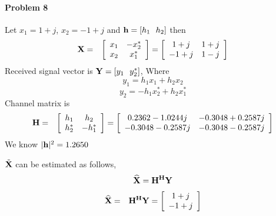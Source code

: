 \documentclass[12pt]{article}
\renewcommand{\hat}{\widehat}
\begin{document}
\paragraph{Problem 8}
Let $x_1=1 + j$, $x_2=-1 + j$ and ${\bf h}=[h_1~~h_2]$ then
\begin{eqnarray*}
{\bf X} &=& \left[
\begin{array}{cccc}
x_1 & -x_2^* \\
x_2 & x_1^*
\end{array}
\right]=\left[
\begin{array}{cccc}
1+j & 1+j \\
-1+j & 1-j
\end{array}
\right]
\end{eqnarray*}
Received signal vector is ${\bf Y}=[y_1~~y_2^*]$, Where $$y_1=h_1x_1+h_2x_2$$ $$y_2=-h_1x_2^*+h_2x_1^*$$
Channel matrix is
\begin{eqnarray*}
{\bf H} &=& \left[
\begin{array}{cccc}
h_1 & h_2 \\
h_2^* & -h_1^*
\end{array}
\right]=\left[
\begin{array}{cccc}
0.2362 - 1.0244j & -0.3048 + 0.2587j \\
-0.3048 - 0.2587j & -0.3048 - 0.2587j
\end{array}
\right]
\end{eqnarray*}
We know $|{\bf h}|^2=1.2650$

$\tilde{{\bf X}}$ can be estimated as follows, $$\hat{{\bf X}}={\bf H^HY}$$
\begin{eqnarray*}
\hat{{\bf X}} &=& {\bf H^HY}=\left[
\begin{array}{cccc}
1 + j  \\
-1 + j 
\end{array}
\right]
\end{eqnarray*}
\end{document}
